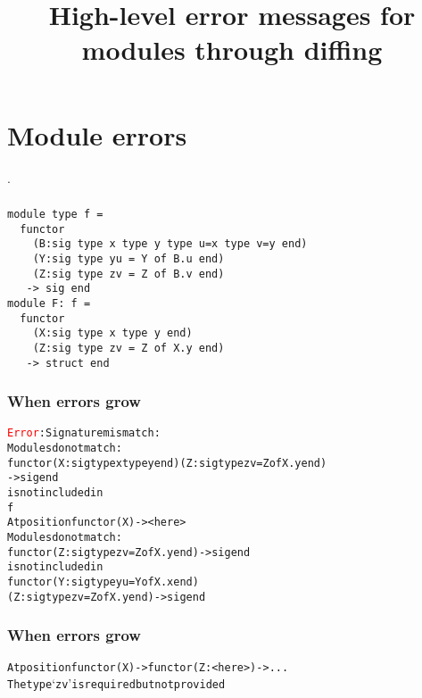 \documentclass[a4paper,11pt]{beamer}
\title[Functor diffing]{High-level error messages for modules through diffing}
\author[Angeletti \& Radanne]{\texorpdfstring{
  \begin{columns}\column{0.5\linewidth}\centering%
  Florian \textsc{Angeletti}\\
  Inria\\
  \href{mailto:florian.angeletti@inria.fr}
  {\nolinkurl{florian.angeletti@inria.fr}}
  \column{0.5\linewidth}\centering%
  Gabriel \textsc{Radanne}\\
  Inria\\
  \href{mailto:gabriel.radanne@inria.fr}
  {\nolinkurl{gabriel.radanne@inria.fr}}
  \end{columns}
  }{F. Angeletti \& G. Radanne}}
\date{}
\newcommand{\error}[1]{\textcolor{red}{#1}}
\begin{document}
\begin{frame}
\maketitle
\end{frame}

\section{Module errors}

\begin{frame}
  .
\end{frame}

\begin{frame}[fragile]\frametitle{}

\begin{verbatim}
module type f =
  functor
    (B:sig type x type y type u=x type v=y end)
    (Y:sig type yu = Y of B.u end)
    (Z:sig type zv = Z of B.v end)
   -> sig end
module F: f =
  functor
    (X:sig type x type y end)
    (Z:sig type zv = Z of X.y end)
   -> struct end
\end{verbatim}

\end{frame}

\begin{frame}[fragile]\frametitle{When errors grow}

\begin{alltt}\error{Error}: Signature mismatch:
       Modules do not match:
         functor (X : sig type x type y end) (Z : sig type zv = Z of X.y end)
           -> sig end
       is not included in
         f
       At position functor (X) -> <here>
       Modules do not match:
         functor (Z : sig type zv = Z of X.y end) -> sig end
       is not included in
         functor (Y : sig type yu = Y of X.x end)
           (Z : sig type zv = Z of X.y end) -> sig end
\end{alltt}

\end{frame}

\begin{frame}[fragile]\frametitle{When errors grow}

\begin{alltt}
       At position functor (X) -> functor (Z : <here>) -> ...
       The type `zv' is required but not provided
\end{alltt}

\end{frame}
\end{document}
